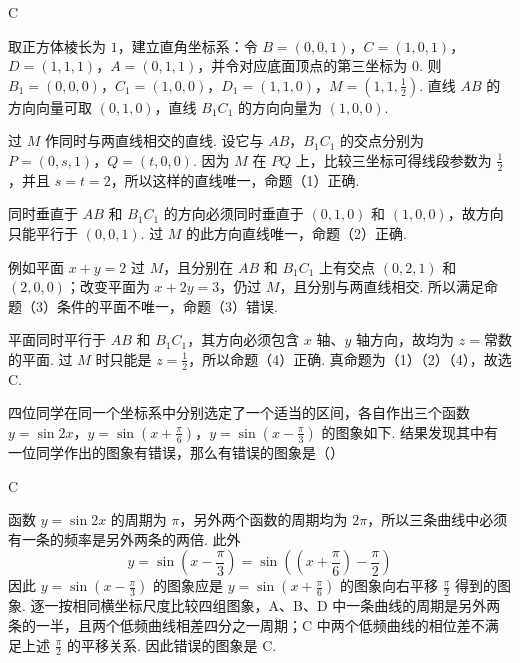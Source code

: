 \begin{answer}
C
\end{answer}

\begin{solution}
取正方体棱长为 \(1\)，建立直角坐标系：令 \(B=(0,0,1)\)，\(C=(1,0,1)\)，\(D=(1,1,1)\)，\(A=(0,1,1)\)，并令对应底面顶点的第三坐标为 \(0\). 则 \(B_{1}=(0,0,0)\)，\(C_{1}=(1,0,0)\)，\(D_{1}=(1,1,0)\)，\(M=(1,1,\frac12)\). 直线 \(AB\) 的方向向量可取 \((0,1,0)\)，直线 \(B_{1}C_{1}\) 的方向向量为 \((1,0,0)\).

过 \(M\) 作同时与两直线相交的直线. 设它与 \(AB\)，\(B_{1}C_{1}\) 的交点分别为 \(P=(0,s,1)\)，\(Q=(t,0,0)\). 因为 \(M\) 在 \(PQ\) 上，比较三坐标可得线段参数为 \(\frac12\)，并且 \(s=t=2\)，所以这样的直线唯一，命题（1）正确.

同时垂直于 \(AB\) 和 \(B_{1}C_{1}\) 的方向必须同时垂直于 \((0,1,0)\) 和 \((1,0,0)\)，故方向只能平行于 \((0,0,1)\). 过 \(M\) 的此方向直线唯一，命题（2）正确.

例如平面 \(x+y=2\) 过 \(M\)，且分别在 \(AB\) 和 \(B_{1}C_{1}\) 上有交点 \((0,2,1)\) 和 \((2,0,0)\)；改变平面为 \(x+2y=3\)，仍过 \(M\)，且分别与两直线相交. 所以满足命题（3）条件的平面不唯一，命题（3）错误.

平面同时平行于 \(AB\) 和 \(B_{1}C_{1}\)，其方向必须包含 \(x\) 轴、\(y\) 轴方向，故均为 \(z=\text{常数}\) 的平面. 过 \(M\) 时只能是 \(z=\frac12\)，所以命题（4）正确. 真命题为（1）（2）（4），故选 C.
\end{solution}

\begin{problem}
四位同学在同一个坐标系中分别选定了一个适当的区间，各自作出三个函数 \(y = \sin 2x\)，\(y = \sin \left(x + \frac{\pi}{6}\right)\)，\(y = \sin \left(x - \frac{\pi}{3}\right)\) 的图象如下. 结果发现其中有一位同学作出的图象有错误，那么有错误的图象是（\quad）

    {}
    {}
    {}
\end{problem}

\begin{answer}
C
\end{answer}

\begin{solution}
函数 \(y=\sin2x\) 的周期为 \(\pi\)，另外两个函数的周期均为 \(2\pi\)，所以三条曲线中必须有一条的频率是另外两条的两倍. 此外
\[
y=\sin\left(x-\frac{\pi}{3}\right)=\sin\left(\left(x+\frac{\pi}{6}\right)-\frac{\pi}{2}\right)
\]
因此 \(y=\sin\left(x-\frac{\pi}{3}\right)\) 的图象应是 \(y=\sin\left(x+\frac{\pi}{6}\right)\) 的图象向右平移 \(\frac{\pi}{2}\) 得到的图象. 逐一按相同横坐标尺度比较四组图象，A、B、D 中一条曲线的周期是另外两条的一半，且两个低频曲线相差四分之一周期；C 中两个低频曲线的相位差不满足上述 \(\frac{\pi}{2}\) 的平移关系. 因此错误的图象是 C.
\end{solution}

